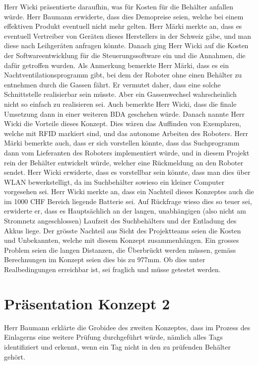\documentclass[parskip=full, a4paper]{scrreprt}
\begin{document}
Herr Wicki präsentierte daraufhin, was für Kosten für die Behälter anfallen würde. Herr Baumann erwiderte, dass dies Demopreise seien, welche bei einem effektiven Produkt eventuell nicht mehr gelten.
Herr Märki merkte an, dass es eventuell Vertreiber von Geräten dieses Herstellers in der Schweiz gäbe, und man diese nach Leihgeräten anfragen könnte.
Danach ging Herr Wicki auf die Kosten der Softwareentwicklung für die Steuerungssoftware ein und die Annahmen, die dafür getroffen wurden. Als Anmerkung bemerkte Herr Märki, dass es ein Nachtventilationsprogramm gibt, bei dem der Roboter ohne einen Behälter zu entnehmen durch die Gassen fährt. Er vermutet daher, dass eine solche Schnittstelle realisierbar sein müsste. Aber ein Gassenwechsel wahrscheinlich nicht so einfach zu realisieren sei.
Auch bemerkte Herr Wicki, dass die finale Umsetzung dann in einer weiteren BDA geschehen würde.
Danach nannte Herr Wicki die Vorteile dieses Konzept. Dies wären das Auffinden von Exemplaren, welche mit RFID markiert sind, und das autonome Arbeiten des Roboters.
Herr Märki bemerkte auch, dass er sich vorstellen könnte, dass das Suchprogramm dann vom Lieferanten des Roboters implementiert würde, und in diesem Projekt rein der Behälter entwickelt würde, welcher eine Rückmeldung an den Roboter sendet. Herr Wicki erwiderte, dass es vorstellbar sein könnte, dass man dies über WLAN bewerkstelligt, da im Suchbehälter sowieso ein kleiner Computer vorgesehen sei.
Herr Wicki merkte an, dass ein Nachteil dieses Konzeptes auch die im 1000 CHF Bereich liegende Batterie sei. Auf Rückfrage wieso dies so teuer sei, erwiderte er, dass es Hauptsächlich an der langen, unabhängigen (also nicht am Stromnetz angeschlossen) Laufzeit des Suchbehälters und der Entladung des Akkus liege. Der grösste Nachteil aus Sicht des Projektteams seien die Kosten und Unbekannten, welche mit diesem Konzept zusammenhängen.
Ein grosses Problem seien die langen Distanzen, die Überbrückt werden müssen, gemäss Berechnungen im Konzept seien dies bis zu  977mm. Ob dies unter Realbedingungen erreichbar ist, sei fraglich und müsse getestet werden.

\chapter{Präsentation Konzept 2}
Herr Baumann erklärte die Grobidee des zweiten Konzeptes, dass im Prozess des Einlagerns eine weitere Prüfung durchgeführt würde, nämlich alles Tags identifiziert und erkennt, wenn ein Tag nicht in den zu prüfenden Behälter gehört.
\end{document}
